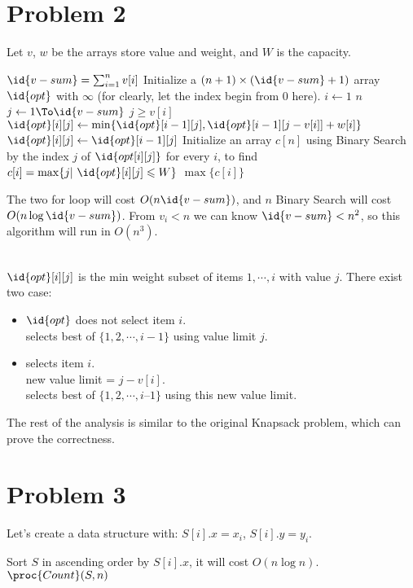 \documentclass{article}
\begin{document}
\section*{Problem 2}
Let $v$, $w$ be the arrays store value and weight, and $W$ is the capacity.
\begin{codebox}
\li $\id{v-sum}=\sum_{i=1}^n v[i]$
\li Initialize a $(n+1)\times (\id{v-sum}+1)$ array $\id{opt}$ with $\infty$
(for clearly, let the index begin from $0$ here).
\li \For $i\gets 1$ \To $n$
\li \Do \For $j\gets 1 \To \id{v-sum}$
\li     \Do \If $j\geqslant v[i]$
\li         \Then
                $\id{opt}[i][j]\gets \min\{\id{opt}[i-1][j], \id{opt}[i-1][j-v[i]]+w[i]\}$
\li         \Else
\li             $\id{opt}[i][j]\gets \id{opt}[i-1][j]$
            \End                 
        \End
    \End
\zi
\li Initialize an array $c[n]$
\li using Binary Search by the index $j$ of $\id{opt[i][j]}$ for every $i$, to find $c[i]=\max\{j|\ \id{opt}[i][j]\leqslant W\}$
\li \Return $\max\{c[i]\}$
\end{codebox}
The two for loop will cost $O(n\id{v-sum})$, 
and $n$ Binary Search will cost $O(n\log\id{v-sum})$.
From $v_i<n$ we can know $\id{v-sum}<n^2$, 
so this algorithm will run in $O(n^3)$.

~\\
\noindent
$\id{opt}[i][j]$ is the min weight subset of items $1,\cdots,i$ with value $j$.
There exist two case:
\begin{itemize}
    \item $\id{opt}$ does not select item $i$.\\
         selects best of $\{ 1, 2,\cdots, i-1 \}$ using value limit $j$.
    \item {} selects item $i$.\\
        new value limit = $j-v[i]$. \\
         selects best of $\{ 1, 2,\cdots , i–1 \}$ using this new value limit.
\end{itemize}
The rest of the analysis is similar to the original Knapsack problem, which can prove the correctness.

\pagebreak
\section*{Problem 3}
Let's create a data structure with: $S[i].x=x_i$, $S[i].y=y_i$.
\begin{codebox}
\li Sort $S$ in ascending order by $S[i].x$, it will cost $O(n\log n)$.
\li \Return $\proc{Count}(S, n)$ 
\end{codebox}
\end{document}
